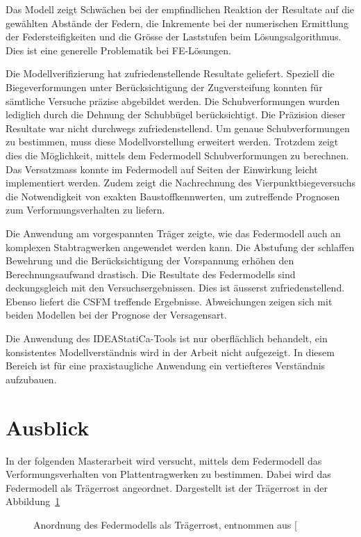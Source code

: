 \documentclass[
  11pt,
  letterpaper,
]{scrreprt}
\begin{document}
Das Modell zeigt Schwächen bei der empfindlichen Reaktion der Resultate
auf die gewählten Abstände der Federn, die Inkremente bei der
numerischen Ermittlung der Federsteifigkeiten und die Grösse der
Laststufen beim Lösungsalgorithmus. Dies ist eine generelle Problematik
bei FE-Lösungen.

Die Modellverifizierung hat zufriedenstellende Resultate geliefert.
Speziell die Biegeverformungen unter Berücksichtigung der Zugversteifung
konnten für sämtliche Versuche präzise abgebildet werden. Die
Schubverformungen wurden lediglich durch die Dehnung der Schubbügel
berücksichtigt. Die Präzision dieser Resultate war nicht durchwegs
zufriedenstellend. Um genaue Schubverformungen zu bestimmen, muss diese
Modellvorstellung erweitert werden. Trotzdem zeigt dies die Möglichkeit,
mittels dem Federmodell Schubverformungen zu berechnen. Das Versatzmass
konnte im Federmodell auf Seiten der Einwirkung leicht implementiert
werden. Zudem zeigt die Nachrechnung des Vierpunktbiegeversuchs die
Notwendigkeit von exakten Baustoffkennwerten, um zutreffende Prognosen
zum Verformungsverhalten zu liefern.

Die Anwendung am vorgespannten Träger zeigte, wie das Federmodell auch
an komplexen Stabtragwerken angewendet werden kann. Die Abstufung der
schlaffen Bewehrung und die Berücksichtigung der Vorspannung erhöhen den
Berechnungsaufwand drastisch. Die Resultate des Federmodells sind
deckungsgleich mit den Versuchsergebnissen. Dies ist äusserst
zufriedenstellend. Ebenso liefert die CSFM treffende Ergebnisse.
Abweichungen zeigen sich mit beiden Modellen bei der Prognose der
Versagensart.

Die Anwendung des IDEAStatiCa-Tools ist nur oberflächlich behandelt, ein
konsistentes Modellverständnis wird in der Arbeit nicht aufgezeigt. In
diesem Bereich ist für eine praxistaugliche Anwendung ein vertiefteres
Verständnis aufzubauen.

\section{Ausblick}\label{ausblick}

In der folgenden Masterarbeit wird versucht, mittels dem Federmodell das
Verformungsverhalten von Plattentragwerken zu bestimmen. Dabei wird das
Federmodell als Trägerrost angeordnet. Dargestellt ist der Trägerrost in
der Abbildung~\ref{fig-traegerrost}

\begin{figure}[H]


\caption{\label{fig-traegerrost}Anordnung des Federmodells als
Trägerrost, entnommen aus {[}\citeproc{ref-gitz_ansatze_2024}{1}{]}}

\end{figure}%
\end{document}
